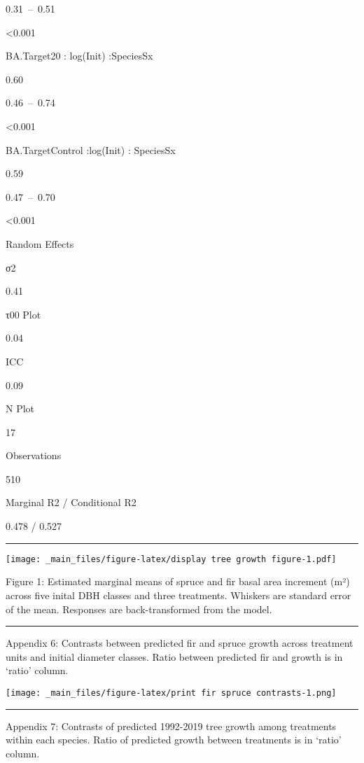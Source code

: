 \documentclass[
]{article}
\begin{document}
0.31~--~0.51

\textless{}0.001

BA.Target20 : log(Init) :SpeciesSx

0.60

0.46~--~0.74

\textless{}0.001

BA.TargetControl :log(Init) : SpeciesSx

0.59

0.47~--~0.70

\textless{}0.001

Random Effects

σ2

0.41

τ00 Plot

0.04

ICC

0.09

N Plot

17

Observations

510

Marginal R2 / Conditional R2

0.478 / 0.527

\begin{center}\rule{0.5\linewidth}{0.5pt}\end{center}

\texttt{[image: \_main\_files/figure-latex/display tree growth figure-1.pdf]}

Figure 1: Estimated marginal means of spruce and fir basal area increment (m²) across five inital DBH classes and three treatments. Whiskers are standard error of the mean. Responses are back-transformed from the model.

\begin{center}\rule{0.5\linewidth}{0.5pt}\end{center}

Appendix 6: Contrasts between predicted fir and spruce growth across treatment units and initial diameter classes. Ratio between predicted fir and growth is in `ratio' column.

\texttt{[image: \_main\_files/figure-latex/print fir spruce contrasts-1.png]}

\begin{center}\rule{0.5\linewidth}{0.5pt}\end{center}

Appendix 7: Contrasts of predicted 1992-2019 tree growth among treatments within each species. Ratio of predicted growth between treatments is in `ratio' column.
\end{document}
